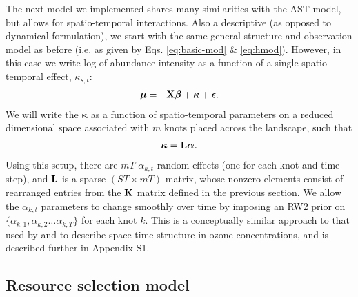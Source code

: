 \documentclass[12pt,english]{article}
\begin{document}
\begin{spacing}{1.9}
The next model we implemented shares many similarities with the AST model, but allows for spatio-temporal interactions.  Also a descriptive (as opposed to dynamical formulation), we start
with the same general structure and observation model as before (i.e. as given by Eqs. \ref{eq:basic-mod} \& \ref{eq:hmod}).  However, in this case we write log of abundance intensity as a function of a single spatio-temporal
effect, $\kappa_{s,t}$:
\begin{eqnarray*}
  \boldsymbol{\mu} & = & {\bf X} \boldsymbol{\beta} + \boldsymbol{\kappa} + \boldsymbol{\epsilon}.
\end{eqnarray*}
We will write the $\boldsymbol{\kappa}$ as a function of spatio-temporal parameters on a reduced dimensional space associated with $m$ knots placed across the landscape, such that
\begin{eqnarray*}
  \boldsymbol{\kappa} = {\bf L} \boldsymbol{\alpha}.
\end{eqnarray*}
Using this setup, there are $mT$ $\alpha_{k,t}$ random effects (one for each knot and time step), and ${\bf L}$ is a sparse $(ST \times mT)$ matrix, whose nonzero elements consist of rearranged entries from the ${\bf K}$ matrix defined in the previous section.  We allow the
$\alpha_{k,t}$ parameters to change smoothly over time by imposing an RW2 prior on $\{ \alpha_{k,1}, \alpha_{k,2} \hdots \alpha_{k,T} \}$ for each knot $k$.
This is a conceptually similar approach to that used by \citet{CalderEtAl2002} and \citet{Higdon2002} to describe space-time structure in ozone concentrations, and is described further in Appendix S1.

\subsection{Resource selection model}


\end{spacing}
\end{document}

